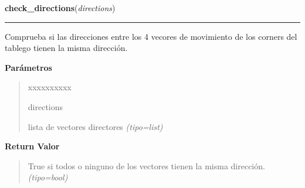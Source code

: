 \hspace{.8\funcindent}\begin{boxedminipage}{\funcwidth}

    \raggedright \textbf{check\_directions}(\textit{directions})

    \vspace{-1.5ex}

    \rule{\textwidth}{0.5\fboxrule}
\setlength{\parskip}{2ex}
Comprueba si las direcciones entre los 4 vecores de movimiento de los corners del tablego tienen la misma dirección.

\setlength{\parskip}{1ex}
      \textbf{Parámetros}
      \vspace{-1ex}

      \begin{quote}
        \begin{Ventry}{xxxxxxxxxx}

          \item[directions]


lista de vectores directores
            {\it (tipo=list)}

        \end{Ventry}

      \end{quote}

      \textbf{Return Valor}
    \vspace{-1ex}

      \begin{quote}

True si todos o ninguno de los vectores tienen la misma dirección.
      {\it (tipo=bool)}

      \end{quote}

    \end{boxedminipage}

    \label{src:check_goban_moved:check_goban_moved}

    \vspace{0.5ex}

